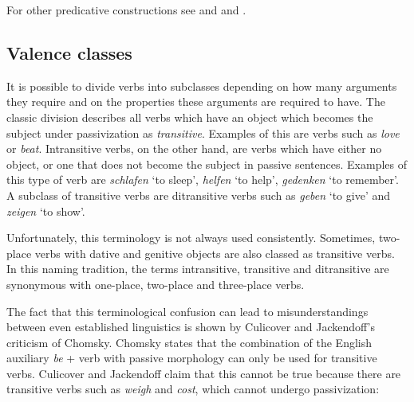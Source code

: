 {For other predicative constructions see  and 
and .


\subsection{Valence classes}

It is possible to divide verbs into subclasses depending on how many arguments they require and on the properties these arguments are required to have. The
classic division describes all verbs which have an object which becomes the subject under passivization as \emph{transitive}. Examples of this
are verbs such as \emph{love} or \emph{beat}. Intransitive verbs, on the other hand, are verbs which have either no object, or one that does not become the subject in passive
sentences. Examples of this type of verb are \emph{schlafen} `to sleep', \emph{helfen} `to help', \emph{gedenken} `to remember'. A subclass of transitive verbs are 
ditransitive verbs such as \emph{geben} `to give' and \emph{zeigen} `to show'.

Unfortunately, this terminology is not always used consistently. Sometimes, two-place verbs with
dative and genitive objects are also classed as transitive verbs. In this naming tradition, the
terms intransitive, transitive and ditransitive are synonymous with one-place, two-place and
three-place verbs.

The fact that this terminological confusion can lead to misunderstandings between even established linguistics is shown by Culicover and Jackendoff's \citeyearpar[]{CJ2005a} criticism 
of Chomsky. Chomsky states that the combination of the English auxiliary \emph{be} + verb with passive morphology can only be used for transitive verbs. Culicover and Jackendoff claim that this cannot
be true because there are transitive verbs such as \emph{weigh} and \emph{cost}, which cannot undergo passivization:
\eal
{}
\zl

}
